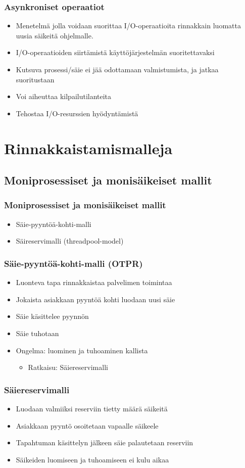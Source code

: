 \documentclass{beamer}
\begin{document}
\begin{frame}
  \frametitle{Asynkroniset operaatiot}
  \begin{itemize}
    \item Menetelmä jolla voidaan suorittaa I/O-operaatioita rinnakkain
      luomatta uusia säikeitä ohjelmalle.
    \item I/O-operaatioiden siirtämistä käyttöjärjestelmän
      suoritettavaksi
    \item Kutsuva prosessi/säie ei jää odottamaan valmistumista,
      ja jatkaa suoritustaan
    \item Voi aiheuttaa kilpailutilanteita
    \item Tehostaa I/O-resurssien hyödyntämistä
  \end{itemize}
\end{frame}
\section{Rinnakkaistamismalleja}
\subsection{Moniprosessiset ja monisäikeiset mallit}
\begin{frame}
  \frametitle{Moniprosessiset ja monisäikeiset mallit}
  \begin{itemize}
    \item Säie-pyyntöä-kohti-malli
    \item Säireservimalli (threadpool-model)
  \end{itemize}
\end{frame}
\begin{frame}
  \frametitle{Säie-pyyntöä-kohti-malli (OTPR)}
  \begin{itemize}
    \item Luonteva tapa rinnakkaistaa palvelimen toimintaa
    \item Jokaista asiakkaan pyyntöä kohti luodaan uusi säie
    \item Säie käsittelee pyynnön
    \item Säie tuhotaan
    \item Ongelma: luominen ja tuhoaminen kallista
      \begin{itemize}
        \item Ratkaisu: Säiereservimalli
      \end{itemize}
  \end{itemize}
\end{frame}
\begin{frame}
  \frametitle{Säiereservimalli}
  \begin{itemize}
    \item Luodaan valmiiksi reserviin tietty määrä säikeitä
    \item Asiakkaan pyyntö osoitetaan vapaalle säikeele
    \item Tapahtuman käsittelyn jälkeen säie palautetaan reserviin
    \item Säikeiden luomiseen ja tuhoamiseen ei kulu aikaa
  \end{itemize}
\end{frame}
\end{document}
